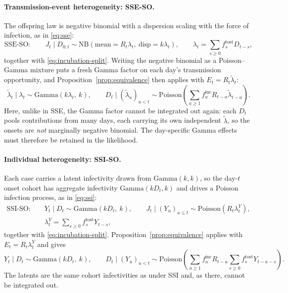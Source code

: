 \documentclass[11pt,a4paper]{article}
\theoremstyle{plain}
\theoremstyle{definition}
\newcommand{\ftost}{f^{\mathrm{tost}}}
\newcommand{\finc}{f^{\mathrm{inc}}}
\newcommand{\NB}{\mathrm{NB}}
\newcommand{\Pois}{\mathrm{Poisson}}
\newcommand{\Gam}{\mathrm{Gamma}}
\newcommand{\sse}{SSE}
\newcommand{\ssi}{SSI}
\newcommand{\sseso}{SSE-SO}
\newcommand{\ssiso}{SSI-SO}
\begin{document}
\paragraph{Transmission-event heterogeneity: \sseso{}.} The offspring law is negative
binomial with a dispersion scaling with the force of infection, as in \eqref{eq:sse}:
\begin{equation}
  \text{\sseso{}}: \qquad
  J_t \mid D_{0:t} \sim \NB\!\left(\text{mean}=R_t\lambda_t,\ \text{disp}=k\lambda_t\right),
  \qquad
  \lambda_t = \sum_{s\ge0}\ftost_s D_{t-s},
  \label{eq:sseso-natural}
\end{equation}
together with \eqref{eq:incubation-split}. Writing the negative binomial as a Poisson--Gamma
mixture puts a fresh Gamma factor on each day's transmission opportunity, and
Proposition~\ref{prop:equivalence} then applies with $E_t = R_t\tilde\lambda_t$:
\begin{equation}
  \tilde\lambda_t \mid \lambda_t \sim \Gam\!\left(k\lambda_t,\ k\right),
  \qquad
  D_t \mid (\tilde\lambda_u)_{u<t} \sim
  \Pois\!\left(\sum_{a\ge1}\finc_a R_{t-a}\tilde\lambda_{t-a}\right).
  \label{eq:sseso-convenient}
\end{equation}
Here, unlike in \sse{}, the Gamma factor cannot be integrated out again: each $D_t$ pools
contributions from many days, each carrying its own independent $\tilde\lambda$, so the onsets
are \emph{not} marginally negative binomial. The day-specific Gamma effects must therefore be
retained in the likelihood.

\paragraph{Individual heterogeneity: \ssiso{}.} Each case carries a latent
infectivity drawn from $\Gam(k,k)$, so the day-$t$ onset cohort has aggregate infectivity
$\Gam(kD_t,k)$ and drives a Poisson infection process, as in \eqref{eq:ssi}:
\begin{equation}
\begin{aligned}
  \text{\ssiso{}}: \qquad
  &Y_t \mid D_t \sim \Gam\!\left(kD_t,\ k\right),
  \qquad
  J_t \mid (Y_u)_{u\le t} \sim \Pois\!\left(R_t\lambda^{Y}_t\right), \\
  &\lambda^{Y}_t = \sum_{s\ge0}\ftost_s Y_{t-s},
\end{aligned}
\label{eq:ssiso-natural}
\end{equation}
together with \eqref{eq:incubation-split}. Proposition~\ref{prop:equivalence} applies with
$E_t = R_t\lambda^{Y}_t$ and gives
\begin{equation}
  Y_t \mid D_t \sim \Gam\!\left(kD_t,\ k\right),
  \qquad
  D_t \mid (Y_u)_{u<t} \sim
  \Pois\!\left(\sum_{a\ge1}\finc_a R_{t-a}\sum_{s\ge0}\ftost_s Y_{t-a-s}\right).
  \label{eq:ssiso-convenient}
\end{equation}
The latents are the same cohort infectivities as under \ssi{} and, as there, cannot be integrated
out.
\end{document}
